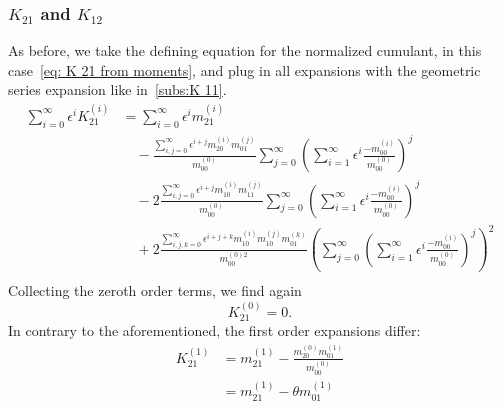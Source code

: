 \subsubsection{\texorpdfstring{$K_{21}$}{K 21} and \texorpdfstring{$K_{12}$}{K 12}}
\label{subs:K 21}
As before, we take the defining equation for the normalized cumulant, in this case~\eqref{eq: K 21 from moments}, and plug in all expansions with the geometric series expansion like in~\ref{subs:K 11}.
\begin{equation}
  \begin{aligned}
    \sum_{i=0}^\infty \epsilon^i K_{21}^{(i)}
    & = \sum_{i=0}^\infty \epsilon^i m_{21}^{(i)}
    \\ &\quad
    - \frac{\sum_{i,j=0}^\infty \epsilon^{i+j} m_{20}^{(i)} m_{01}^{(j)}}{m_{00}^{(0)}}
      \sum_{j=0}^\infty {\left(\sum_{i=1}^\infty \epsilon^i \frac{ - m_{00}^{(i)}}{ m_{00}^{(0)}}\right)}^j
    \\ &\quad
     - 2\frac{\sum_{i,j=0}^\infty \epsilon^{i+j} m_{10}^{(i)} m_{11}^{(j)}}{m_{00}^{(0)}}
      \sum_{j=0}^\infty {\left(\sum_{i=1}^\infty \epsilon^i \frac{ - m_{00}^{(i)}}{ m_{00}^{(0)}}\right)}^j
     \\ &\quad
     + 2\frac{\sum_{i,j,k=0}^\infty \epsilon^{i+j+k} m_{10}^{(i)} m_{10}^{(j)} m_{01}^{(k)}}{m_{00}^{(0)2}}
      {\left(
        \sum_{j=0}^\infty {\left(\sum_{i=1}^\infty \epsilon^i \frac{ - m_{00}^{(i)}}{ m_{00}^{(0)}}\right)}^j
      \right)}^2\\
   \end{aligned}
\end{equation}
Collecting the zeroth order terms, we find again
\begin{equation}
  K_{21}^{(0)} = 0.
\end{equation}
In contrary to the aforementioned, the first order expansions differ:
\begin{equation}
  \begin{aligned}
    K_{21}^{(1)} & = m_{21}^{(1)}
    - \frac{m_{20}^{(0)} m_{01}^{(1)}}{m_{00}^{(0)}}
    \\ &
    = m_{21}^{(1)} - \theta m_{01}^{(1)}
  \end{aligned}
\end{equation}

